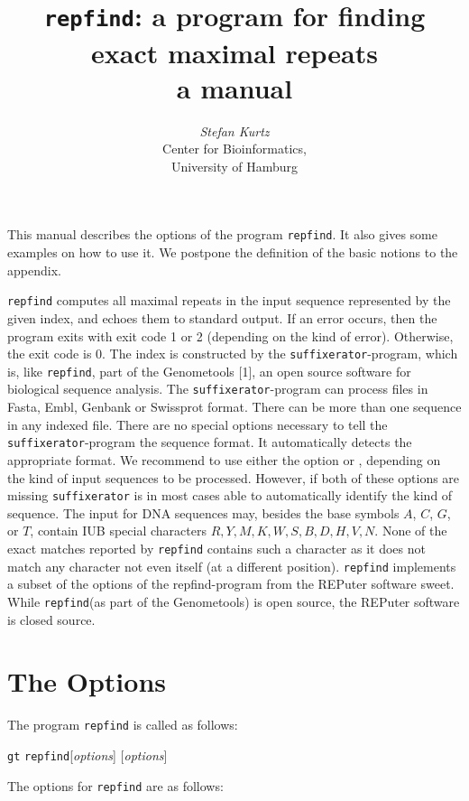 \documentclass[12pt]{article}
\title{\texttt{repfind}: a program for finding exact maximal repeats\\
       a manual}
\author{\begin{tabular}{c}
         \textit{Stefan Kurtz}\\
         Center for Bioinformatics,\\
         University of Hamburg
        \end{tabular}}
\newcommand{\Repfind}[0]{\texttt{\small repfind}\xspace}
\newcommand{\Suffixerator}[0]{\texttt{\small suffixerator}\xspace}
\begin{document}
\maketitle
This manual describes the options of the program \Repfind. It also gives
some examples on how to use it. We postpone the 
definition of the basic notions to the appendix.

\Repfind computes all maximal repeats in 
the input sequence represented by the given index,
and echoes them to standard output. 
If an error occurs, then the program exits with exit code 1 or 2 (depending on
the kind of error). Otherwise, the exit code is 0. The index is constructed
by the \Suffixerator-program, which is, like \Repfind, part of the
Genometools [1], an open source software for biological sequence analysis.
The \Suffixerator-program can process files in Fasta, Embl, Genbank or
Swissprot format. There can be more than one sequence in any
indexed file.  There are no special options necessary to tell  the
\Suffixerator-program the sequence format. It automatically detects the 
appropriate format. We recommend to use either the option  or 
, depending on the kind of input sequences to be processed.
However, if both of these options are missing \Suffixerator is in most
cases able to automatically identify the kind of sequence. The input for
DNA sequences may, besides the base symbols \(A\), \(C\), \(G\), or \(T\),
contain IUB special characters \(R,Y,M,K,W,S,B,D,H,V,N\). None of the
exact matches reported by \Repfind contains such a character as it
does not match any character not even itself (at a different position).
\Repfind implements a subset of the options of the repfind-program
from the REPuter software sweet. While \Repfind (as part of the Genometools)
is open source, the REPuter software is closed source.

\section{The Options}

The program \Repfind is called as follows:
\par
\noindent\texttt{gt} \Repfind [\textit{options}] 
 [\textit{options}] 

The options for \Repfind are as follows:
\end{document}
